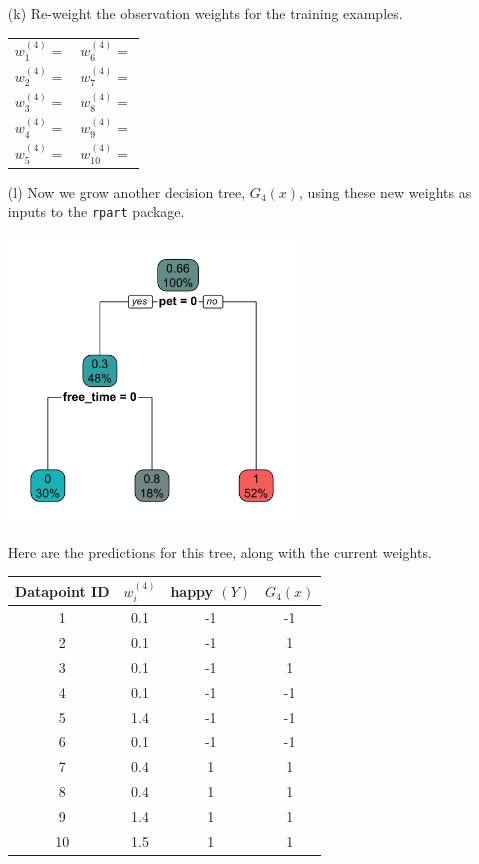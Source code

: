\begin{enumerate}
\item[(k)] Re-weight the observation weights for the training examples. 
\begin{center}
\begin{tabular}{p{}p{}}
$w_1^{(4)} = $ \hfill & $w_6^{(4)} = $ \hfill \\
$w_2^{(4)} = $ \hfill & $w_7^{(4)} = $ \hfill \\
$w_3^{(4)} = $ \hfill & $w_8^{(4)} = $ \hfill \\
$w_4^{(4)} = $ \hfill & $w_9^{(4)} = $ \hfill \\
$w_5^{(4)} = $ \hfill & $w_{10}^{(4)} = $ \hfill \\
\end{tabular}
\end{center}

\item[(l)] Now we grow another decision tree, $G_4(x)$, using these new weights as inputs to the \texttt{rpart} package. 

\begin{center}
\includegraphics[width=0.6\textwidth]{img/happiness-boosting-tree-4.png}
\end{center}

Here are the predictions for this tree, along with the current weights.

{\small
\begin{center}
\begin{tabular}{cccc}
\toprule
Datapoint ID & $w_i^{(4)}$ & happy $(Y)$ & $G_4(x)$ \\
\midrule
1 & 0.1 & -1 & -1 \\
2 & 0.1 & -1 & 1 \\
3 & 0.1 & -1 & 1 \\
4 & 0.1 & -1 & -1 \\
5 & 1.4 & -1 & -1 \\
6 & 0.1 & -1 & -1 \\
\midrule
7 & 0.4 & 1 & 1 \\
8 & 0.4 & 1 & 1 \\
9 & 1.4 & 1 & 1 \\
10 & 1.5 & 1 & 1 \\
\bottomrule
\end{tabular}
\end{center}
}


\end{enumerate}
